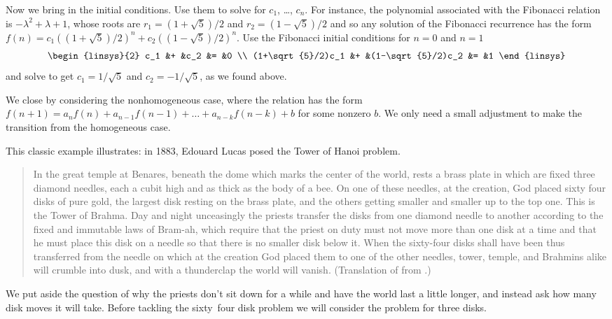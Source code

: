 Now we bring in the initial conditions. 
Use them to solve for $c_1$, \ldots, $c_n$.
For instance, the polynomial associated with the Fibonacci relation is
$-\lambda^2+\lambda+1$, whose roots are $r_1=(1+\sqrt{5})/2$
and $r_2=(1-\sqrt{5})/2$
and so any solution of the Fibonacci recurrence 
has the form $f(n)=c_1((1+\sqrt{5})/2)^n+c_2((1-\sqrt{5})/2)^n$.
Use the Fibonacci initial conditions for $n=0$ and $n=1$ 
\begin{equation*}
  \begin{linsys}{2}
    c_1               &+  &c_2               &=  &0  \\
    (1+\sqrt{5}/2)c_1 &+  &(1-\sqrt{5}/2)c_2 &=  &1
  \end{linsys}
\end{equation*}
and solve to get $c_1=1/\sqrt{5}$ and $c_2=-1/\sqrt{5}$, as we found above.

We close by considering the nonhomogeneous case,
where the relation has the form
$f(n+1)=a_nf(n)+a_{n-1}f(n-1)+\dots+a_{n-k}f(n-k)+b$ for some nonzero $b$.
We only need a small adjustment
to make the transition from the homogeneous case.

This classic example illustrates:
in 1883, Edouard Lucas posed the
Tower of Hanoi problem.
\begin{quotation}
  \noindent
  In the great temple at Benares, beneath the dome which marks the center 
  of the world, rests a brass plate in which are fixed three diamond needles,
  each a cubit high and as thick as the body of a bee.
  On one of these needles, at the creation,
  God placed sixty four disks of pure gold, the largest disk resting on 
  the brass plate, and the others getting smaller and smaller up to the
  top one.
  This is the Tower of Brahma.
  Day and night unceasingly the priests transfer the disks from one diamond
  needle to another according to the fixed and immutable laws of Bram-ah,
  which require that the priest on duty must not move more than one disk at a 
  time and that he must place this disk on a needle so that there is no
  smaller disk below it.
  When the sixty-four disks shall have been thus transferred from the needle
  on which at the creation God placed them to one of the other needles,
  tower, temple, and Brahmins alike will crumble into dusk, and with
  a thunderclap the world will vanish.
  (Translation of \cite{DeParville} from \cite{Ball}.)
\end{quotation}
We put aside the question of why the priests don't sit down for a while
and have the world last a little longer, and instead ask
how many disk moves it will take.
Before tackling the sixty~four disk problem 
we will consider the 
problem for three disks.

